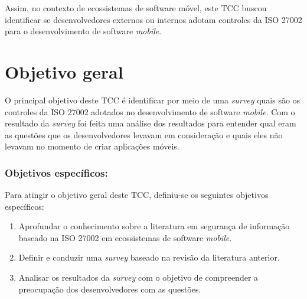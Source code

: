 Assim, no contexto de ecossistemas de software móvel, este TCC  buscou identificar se desenvolvedores externos ou internos adotam controles da ISO 27002 para o desenvolvimento de software \textit{mobile}.



\section{Objetivo geral}

O principal objetivo deste TCC é identificar por meio de uma \textit{survey} quais são os controles da ISO 27002 adotados no desenvolvimento de software \textit{mobile}. Com o resultado da \textit{survey} foi feita uma análise dos resultados para entender qual eram as questões que os desenvolvedores levavam em consideração e quais eles não levavam no momento de criar aplicações móveis.

 
\subsubsection{\textbf{Objetivos específicos:}}

Para atingir o objetivo geral deste TCC, definiu-se os seguintes objetivos específicos:

\begin{enumerate}
    \item Aprofundar o conhecimento sobre a literatura em segurança de informação baseado na ISO 27002 em ecossistemas de software \textit{mobile}.
    
    \item Definir e conduzir uma \textit{survey} baseado na revisão da literatura anterior.
    
    \item Analisar os resultados da \textit{survey} com o objetivo de compreender a preocupação dos desenvolvedores com as questões.
    
    
\end{enumerate}


      



